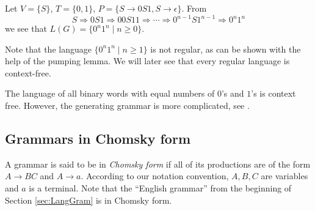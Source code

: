 \begin{page}
\setcounter{section}{5}
\setcounter{subsection}{1}
\setcounter{dfn}{4}
\label{portion:1084}

\begin{exl}
\label{exl:0n1n}
Let $V = \{S\}$, $T = \{0, 1\}$, $P = \{S \to 0S1, S \to \epsilon\}$.
From
\[
S \Rightarrow 0S1 \Rightarrow 00S11 \Rightarrow \cdots \Rightarrow 0^{n-1}S1^{n-1} \Rightarrow 0^n1^n
\]
we see that $L(G) = \{0^n1^n \mid n \ge 0\}$.
\end{exl}

\end{page}

\begin{page}
\setcounter{section}{5}
\setcounter{subsection}{1}
\setcounter{dfn}{4}
\label{portion:1085}


Note that the language $\{0^n1^n \mid n \ge 1\}$ is not regular, as can be shown with the help of the pumping lemma.
We will later see that every regular language is context-free.


\end{page}

\begin{page}
\setcounter{section}{5}
\setcounter{subsection}{1}
\setcounter{dfn}{5}
\label{portion:1087}

\begin{exl}
The language of all binary words with equal numbers of $0$'s and $1$'s is context free.
However, the generating grammar is more complicated, see \cite[Example 4.3]{HU79}.
\end{exl}

\end{page}

\begin{page}
\setcounter{section}{5}
\setcounter{subsection}{2}
\setcounter{dfn}{5}
\label{portion:1089}

\subsection{Grammars in Chomsky form}
A grammar is said to be in \emph{Chomsky form} if all of its productions are of the form $A \to BC$ and $A \to a$.
According to our notation convention, $A, B, C$ are variables and $a$ is a terminal.
Note that the ``English grammar'' from the beginning of Section \ref{sec:LangGram} is in Chomsky form.


\end{page}


